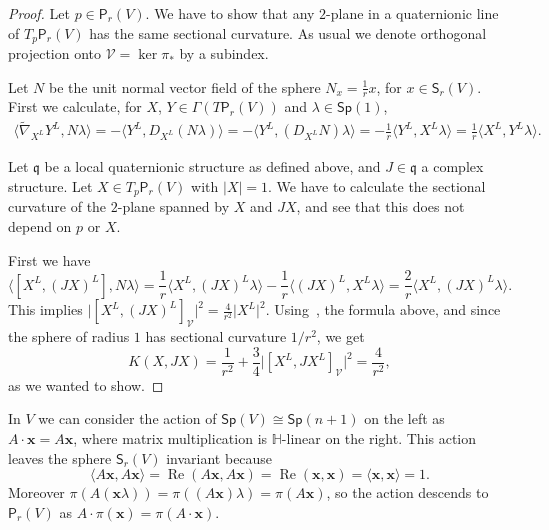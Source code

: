 \documentclass[12pt, a4paper]{amsart}
\newcommand{\g}{\mathfrak}
\renewcommand{\H}{\mathbb{H}}
\renewcommand{\Re}{\operatorname{Re}}
\newcommand{\Sp}{\mathsf{Sp}}
\theoremstyle{remark}
\begin{document}
\begin{proof}
Let $p\in\mathsf{P}_r(V)$.
We have to show that any $2$-plane in a quaternionic line of $T_p\mathsf{P}_r(V)$ has the same sectional curvature.
As usual we denote orthogonal projection onto $\mathcal{V}=\ker\pi_*$ by a subindex.

Let $N$ be the unit normal vector field of the sphere $N_x=\frac{1}{r}x$, for $x\in\mathsf{S}_r(V)$.
First we calculate, for $X$, $Y\in\Gamma(T\mathsf{P}_r(V))$ and $\lambda\in\Sp(1)$,
\[
\begin{aligned}
\langle \tilde{\nabla}_{X^L} Y^L,N\lambda\rangle
=-\langle Y^L,D_{X^L}(N\lambda)\rangle
=-\langle Y^L,(D_{X^L}N)\lambda\rangle
=-\frac{1}{r}\langle Y^L,X^L \lambda\rangle
=\frac{1}{r}\langle X^L,Y^L \lambda\rangle.
\end{aligned}
\]

Let $\g{q}$ be a local quaternionic structure as defined above, and $J\in\g{q}$ a complex structure.
Let $X\in T_p\mathsf{P}_r(V)$ with $\lvert X\rvert=1$. 
We have to calculate the sectional curvature of the $2$-plane spanned by $X$ and $JX$, and see that this does not depend on $p$ or $X$.

First we have 
\[
\langle[X^L,(JX)^L],N\lambda\rangle
=\frac{1}{r}\langle X^L,(JX)^L\lambda\rangle-\frac{1}{r}\langle(JX)^L,X^L\lambda\rangle
=\frac{2}{r}\langle X^L,(JX)^L\lambda\rangle.
\]
This implies $\lvert[X^L,(JX)^L]_\mathcal{V}\rvert^2=\frac{4}{r^2}\lvert X^L\rvert^2$.
Using~\cite[Corollary~1]{ONeill}, the formula above, and since the sphere of radius $1$ has sectional curvature $1/r^2$, we get
\[
K(X, JX)
=\frac{1}{r^2}+\frac{3}{4}\bigl\lvert[X^L,JX^L]_\mathcal{V}\bigr\rvert^2
=\frac{4}{r^2},
\]
as we wanted to show.
\end{proof}

In $V$ we can consider the action of $\Sp(V)\cong\Sp(n+1)$ on the left as
$A\cdot\mathbf{x}=A\mathbf{x}$, where matrix multiplication is $\H$-linear on the right.
This action leaves the sphere $\mathsf{S}_r(V)$ invariant because
\[
\langle A\mathbf{x},A\mathbf{x}\rangle
=\Re(A\mathbf{x},A\mathbf{x})
=\Re(\mathbf{x},\mathbf{x})
=\langle \mathbf{x},\mathbf{x}\rangle=1.
\]
Moreover $\pi(A(\mathbf{x}\lambda))=\pi((A\mathbf{x})\lambda)=\pi(A\mathbf{x})$, so the action descends to $\mathsf{P}_r(V)$ as $A\cdot\pi(\mathbf{x})=\pi(A\cdot\mathbf{x})$.
\end{document}
